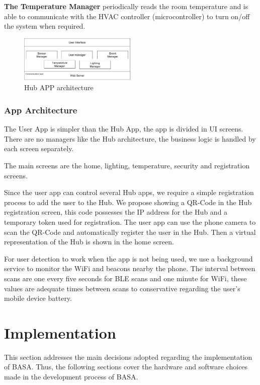 \documentclass[conference]{IEEEtran}
\begin{document}
\textbf{The Temperature Manager} periodically reads the room temperature and is able to communicate with the \ac{HVAC} controller (microcontroller) to turn on/off the system when required.


\begin{figure}[h]
\centering
\includegraphics[width=0.5\textwidth]{Figures/software_hub}
\caption{Hub APP architecture }
\label{software2}
\end{figure}



\subsubsection{App Architecture}
The User App is simpler than the Hub App, the app is divided in \ac{UI} screens. There are no managers like the Hub architecture, the business logic is handled by each screen separately. 

The main screens are the home, lighting, temperature, security and registration screens.

Since the user app can control several Hub apps, we require a simple registration process to add the user to the Hub. We propose showing a QR-Code in the Hub registration screen, this code possesses the \ac{IP} address for the Hub and a temporary token used for registration. The user app can use the phone camera to scan the QR-Code and automatically register the user in the Hub. Then a virtual representation of the Hub is shown in the home screen.

For user detection to work when the app is not being used, we use a background service to monitor the \ac{WiFi} and beacons nearby the phone. The interval between scans are one every five seconds for \ac{BLE} scans and one minute for WiFi, these values are adequate times between scans to conservative regarding the user's mobile device battery.



\section{Implementation}

This section addresses the main decisions adopted regarding the implementation of BASA.
Thus, the following sections cover the hardware and software choices made in the development process of BASA.
\end{document}
